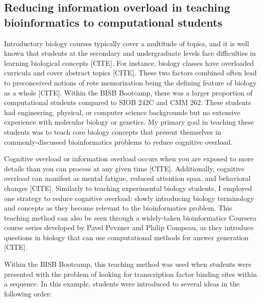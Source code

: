 \subsection{Reducing information overload in teaching bioinformatics to computational students}

Introductory biology courses typically cover a multitude of topics, and it is well known that students at the secondary and undergraduate levels face difficulties in learning biological concepts [CITE]. For instance, biology classes have overloaded curricula and cover abstract topics [CITE]. These two factors combined often lead to preconceived notions of rote memorization being the defining feature of biology as a whole [CITE]. Within the BISB Bootcamp, there was a larger proportion of computational students compared to SIOB 242C and CMM 262. These students had engineering, physical, or computer science backgrounds but no extensive experience with molecular biology or genetics. My primary goal in teaching these students was to teach core biology concepts that present themselves in commonly-discussed bioinformatics problems to reduce cognitive overload. 

Cognitive overload or information overload occurs when you are exposed to more details than you can process at any given time [CITE]. Additionally, cognitive overload can manifest as mental fatigue, reduced attention span, and behavioral changes [CITE]. Similarly to teaching experimental biology students, I employed one strategy to reduce cognitive overload: slowly introducing biology terminology and concepts as they become relevant to the bioinformatics problem. This teaching method can also be seen through a widely-taken bioinformatics Coursera course series developed by Pavel Pevzner and Philip Compeau, as they introduce questions in biology that can use computational methods for answer generation [CITE]. 

Within the BISB Bootcamp, this teaching method was used when students were presented with the problem of looking for transcription factor binding sites within a sequence. In this example, students were introduced to several ideas in the following order: 

\par\noindent\dotfill

